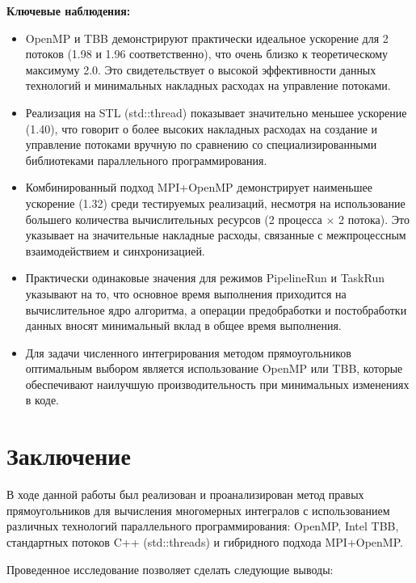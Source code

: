 \documentclass[a4paper,12pt]{article}
\begin{document}
  \textbf{Ключевые наблюдения:}
  \begin{itemize}
    \item OpenMP и TBB демонстрируют практически идеальное ускорение для 2 потоков (1.98 и 1.96 соответственно), что очень близко к теоретическому максимуму 2.0. Это свидетельствует о высокой эффективности данных технологий и минимальных накладных расходах на управление потоками.
    \item Реализация на STL (std::thread) показывает значительно меньшее ускорение (1.40), что говорит о более высоких накладных расходах на создание и управление потоками вручную по сравнению со специализированными библиотеками параллельного программирования.
    \item Комбинированный подход MPI+OpenMP демонстрирует наименьшее ускорение (1.32) среди тестируемых реализаций, несмотря на использование большего количества вычислительных ресурсов (2 процесса $\times$ 2 потока). Это указывает на значительные накладные расходы, связанные с межпроцессным взаимодействием и синхронизацией.
    \item Практически одинаковые значения для режимов PipelineRun и TaskRun указывают на то, что основное время выполнения приходится на вычислительное ядро алгоритма, а операции предобработки и постобработки данных вносят минимальный вклад в общее время выполнения.
    \item Для задачи численного интегрирования методом прямоугольников оптимальным выбором является использование OpenMP или TBB, которые обеспечивают наилучшую производительность при минимальных изменениях в коде.
  \end{itemize}

  \newpage


  \section{Заключение}\label{sec:conclusion}

  В ходе данной работы был реализован и проанализирован метод правых прямоугольников для вычисления многомерных интегралов с использованием различных технологий параллельного программирования: OpenMP, Intel TBB, стандартных потоков C++ (std::threads) и гибридного подхода MPI+OpenMP.

  Проведенное исследование позволяет сделать следующие выводы:
\end{document}
